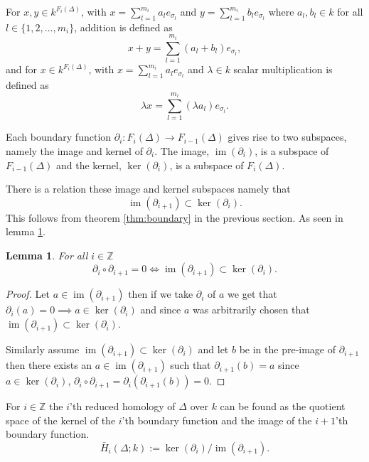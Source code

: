 \documentclass[11pt,a4paper,twoside]{report}
\newtheorem{mylem}[mythm]{Lemma}
\DeclareMathOperator{\im}{im}
\begin{document}
For $x,y\in k^{F_i(\Delta)}$, with $x = \sum_{l=1}^{m_i}a_le_{\sigma_l}$ and $y = \sum_{l=1}^{m_i}b_le_{\sigma_l}$ where $a_l,b_l\in k$ for all $l\in\{1,2,\dots,m_i\}$, addition is defined as 
\begin{equation*}
x+y = \sum_{l=1}^{m_i}(a_l+b_l)e_{\sigma_l},
\end{equation*}
and for $x\in k^{F_i(\Delta)}$, with $x = \sum_{l=1}^{m_i}a_le_{\sigma_l}$ and $\lambda \in k$ scalar multiplication is defined as 
\begin{equation*}
\lambda x = \sum_{l=1}^{m_i}(\lambda a_l)e_{\sigma_l}.
\end{equation*}

Each boundary function $\partial_i:F_i(\Delta)\to F_{i-1}(\Delta)$ gives rise to two subspaces, namely the image and kernel of $\partial_i$. The image, $\im(\partial_i)$, is a subspace of $F_{i-1}(\Delta)$ and the kernel, $\ker(\partial_i)$, is a subspace of $F_{i}(\Delta)$. 

There is a relation these image and kernel subspaces namely that 
\begin{equation*}
\im(\partial_{i+1})\subset\ker(\partial_i).
\end{equation*}
This follows from theorem \ref{thm:boundary} in the previous section. As seen in lemma \ref{lem:subset}.
\begin{mylem}\label{lem:subset}
For all $i\in\mathbb{Z}$ 
\begin{equation*}
\partial_i\circ\partial_{i+1}=0 \Leftrightarrow \im(\partial_{i+1})\subset\ker(\partial_i).
\end{equation*}
\end{mylem}
\begin{proof}
Let $a\in \im(\partial_{i+1})$ then if we take $\partial_i$ of $a$ we get that $\partial_i(a)=0\implies a\in \ker(\partial_i)$ and since $a$ was arbitrarily chosen that $\im(\partial_{i+1})\subset \ker(\partial_i)$. 

Similarly assume $\im(\partial_{i+1})\subset \ker(\partial_i)$ and let $b$ be in the pre-image of $\partial_{i+1}$ then there exists an $a\in\im(\partial_{i+1})$ such that 
$\partial_{i+1}(b)=a$ since $a\in\ker(\partial_i)$, $\partial_i\circ\partial_{i+1}=\partial_i(\partial_{i+1}(b))=0$. 
\end{proof}


For $i\in\mathbb{Z}$ the $i$'th reduced homology of $\Delta$ over $k$ can be found as the quotient space of the kernel of the $i$'th boundary function and the image of the $i+1$'th boundary function. \cite[p.2]{Allgaier}
\begin{equation}
\bar{H}_i(\Delta;k):=\ker(\partial_i)/\im(\partial_{i+1}).
\end{equation}
\end{document}
